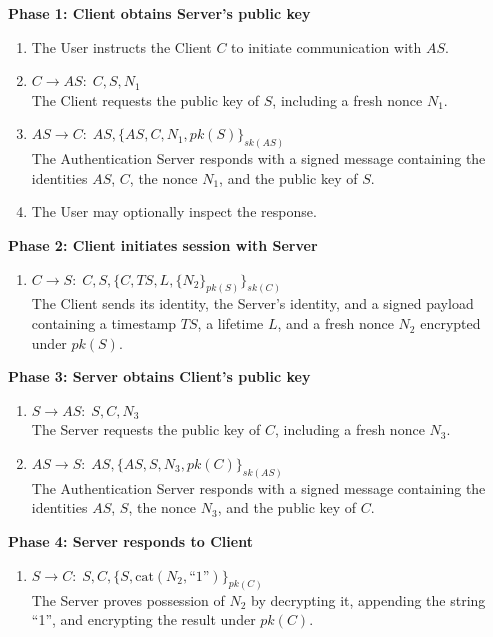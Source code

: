 \documentclass[12pt]{article}
\begin{document}
\noindent
\textbf{Phase 1: Client obtains Server's public key}
\begin{enumerate}[nosep]
\item The User instructs the Client $C$ to initiate communication with $AS$.


\item $C \rightarrow AS: \; C, S, N_1$ \\
The Client requests the public key of $S$, including a fresh nonce $N_1$.

\item $AS \rightarrow C: \; AS, \{AS, C, N_1, pk(S)\}_{sk(AS)}$ \\
The Authentication Server responds with a signed message containing the identities $AS$, $C$, the nonce $N_1$, and the public key of $S$.

\item The User may optionally inspect the response.

\end{enumerate}

\vspace{0.5em}
\noindent
\textbf{Phase 2: Client initiates session with Server}
\begin{enumerate}
    \item $C \rightarrow S: \; C, S, \{C, TS, L, \{N_2\}_{pk(S)}\}_{sk(C)}$ \\
The Client sends its identity, the Server's identity, and a signed payload containing a timestamp $TS$, a lifetime $L$, and a fresh nonce $N_2$ encrypted under $pk(S)$.
\end{enumerate}

\pagebreak
\noindent
\textbf{Phase 3: Server obtains Client's public key}
\begin{enumerate}
    \item $S \rightarrow AS: \; S, C, N_3$ \\
The Server requests the public key of $C$, including a fresh nonce $N_3$.
    \item $AS \rightarrow S: \; AS, \{AS, S, N_3, pk(C)\}_{sk(AS)}$ \\
The Authentication Server responds with a signed message containing the identities $AS$, $S$, the nonce $N_3$, and the public key of $C$.
\end{enumerate}

\vspace{0.5em}
\noindent
\textbf{Phase 4: Server responds to Client}
\begin{enumerate}
    \item $S \rightarrow C: \; S, C, \{S, \text{cat}(N_2,\text{``1''})\}_{pk(C)}$ \\
The Server proves possession of $N_2$ by decrypting it, appending the string ``1'', and encrypting the result under $pk(C)$.
\end{enumerate}
\end{document}
